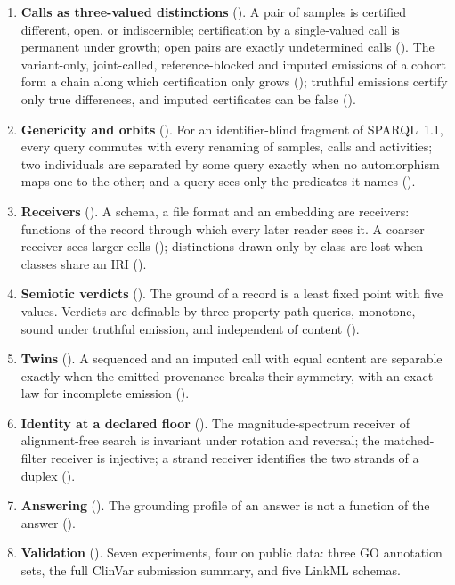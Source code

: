 \documentclass[11pt,twocolumn,a4paper]{article}
\theoremstyle{plain}
\theoremstyle{definition}
\theoremstyle{remark}
\begin{document}
\begin{enumerate}
\item \textbf{Calls as three-valued distinctions} (). A pair of
  samples is certified different, open, or indiscernible; certification by a
  single-valued call is permanent under growth; open pairs are exactly
  undetermined calls (). The
  variant-only, joint-called, reference-blocked and imputed emissions of a
  cohort form a chain along which certification only grows
  (); truthful emissions certify only true differences, and
  imputed certificates can be false ().
\item \textbf{Genericity and orbits} (). For an
  identifier-blind fragment of SPARQL~1.1, every query commutes with every
  renaming of samples, calls and activities; two individuals are separated by
  some query exactly when no automorphism maps one to the other; and a query
  sees only the predicates it names ().
\item \textbf{Receivers} (). A schema, a file format and an
  embedding are receivers: functions of the record through which every later
  reader sees it. A coarser receiver sees larger cells
  (); distinctions drawn only by class are lost when classes
  share an IRI ().
\item \textbf{Semiotic verdicts} (). The ground of a
  record is a least fixed point with five values. Verdicts are definable by
  three property-path queries, monotone, sound under truthful emission, and
  independent of content ().
\item \textbf{Twins} (). A sequenced and an imputed call with
  equal content are separable exactly when the emitted provenance breaks
  their symmetry, with an exact law for incomplete emission
  ().
\item \textbf{Identity at a declared floor} (). The
  magnitude-spectrum receiver of alignment-free search is invariant under
  rotation and reversal; the matched-filter receiver is injective; a strand
  receiver identifies the two strands of a duplex
  ().
\item \textbf{Answering} (). The grounding profile of an
  answer is not a function of the answer ().
\item \textbf{Validation} (). Seven experiments, four on
  public data: three GO annotation sets, the full ClinVar submission summary,
  and five LinkML schemas.
\end{enumerate}
\end{document}
